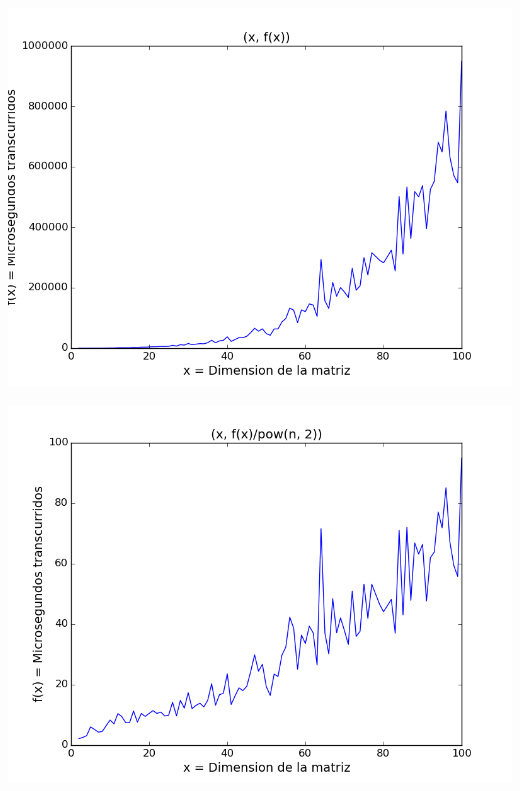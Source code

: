 \begin{center}
\includegraphics[scale=0.54]{images/1potenciafuncion}
\end{center}


\begin{center}
\includegraphics[scale=0.54]{images/1potenciasobrecuadrado}
\end{center}


